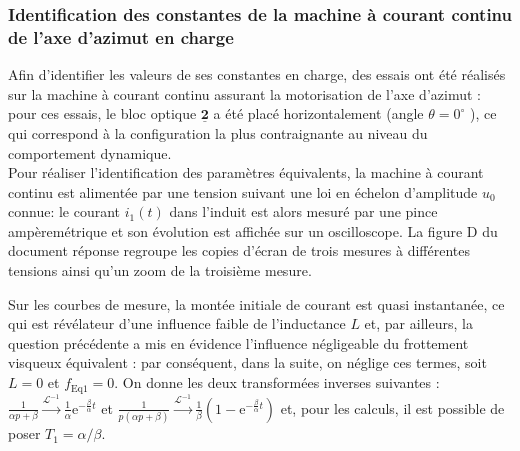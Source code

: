 \subsubsection{Identification des constantes de la machine à courant continu de l'axe d'azimut en charge}
Afin d'identifier les valeurs de ses constantes en charge, des essais ont été réalisés sur la machine à courant continu assurant la motorisation de l'axe d'azimut : pour ces essais, le bloc optique $\underline{\mathbf{2}}$ a été placé horizontalement (angle $\theta=0^{\circ}$ ), ce qui correspond à la configuration la plus contraignante au niveau du comportement dynamique.\\
Pour réaliser l'identification des paramètres équivalents, la machine à courant continu est alimentée par une tension suivant une loi en échelon d'amplitude $u_{0}$ connue: le courant $i_{1}(t)$ dans l'induit est alors mesuré par une pince ampèremétrique et son évolution est affichée sur un oscilloscope. La figure D du document réponse regroupe les copies d'écran de trois mesures à différentes tensions ainsi qu'un zoom de la troisième mesure.\\

\ifprof
\begin{corrige}
\end{corrige}
\else
\fi


Sur les courbes de mesure, la montée initiale de courant est quasi instantanée, ce qui est révélateur d'une influence faible de l'inductance $L$ et, par ailleurs, la question précédente a mis en évidence l'influence négligeable du frottement visqueux équivalent : par conséquent, dans la suite, on néglige ces termes, soit $L=0$ et $f_{\mathrm{Eq} 1}=0$. On donne les deux transformées inverses suivantes : $\frac{1}{\alpha p+\beta} \xrightarrow{\mathcal{L}^{-1}} \frac{1}{\alpha} \mathrm{e}^{-\frac{\beta}{\alpha} t}$ et $\frac{1}{p(\alpha p+\beta)} \xrightarrow{\mathcal{L}^{-1}} \frac{1}{\beta}\left(1-\mathrm{e}^{-\frac{\beta}{\alpha} t}\right)$ et, pour les calculs, il est possible de poser $T_{1}=\alpha / \beta$.

\ifprof
\begin{corrige}
\end{corrige}
\else
\fi


